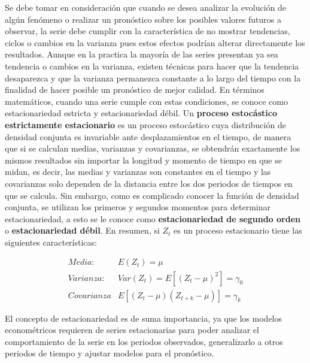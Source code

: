 Se debe tomar en consideración que cuando se desea analizar la evolución de algún fenómeno o realizar un pronóstico sobre los posibles valores futuros a observar, la serie debe cumplir con la característica de no mostrar tendencias, ciclos o cambios en la varianza  pues estos efectos podrían alterar directamente los resultados. Aunque en la practica la mayoría de las series presentan ya sea tendencia o cambios en la varianza, existen técnicas para hacer que la tendencia desaparezca y que la varianza permanezca constante a lo largo del tiempo con la finalidad de hacer posible un pronóstico de mejor calidad. En términos matemáticos, cuando una serie cumple con estas condiciones, se conoce como estacionariedad estricta y estacionariedad débil. Un \textbf{proceso estocástico estrictamente estacionario} es un proceso estocástico cuya distribución de densidad conjunta es invariable ante desplazamientos en el tiempo, de manera que si se calculan medias, varianzas y covarianzas, se obtendrán exactamente los mismos resultados sin importar la longitud y momento de tiempo en que se midan, es decir, las medias y varianzas son constantes en el tiempo y las covarianzas  solo dependen de la distancia entre los dos periodos de tiempos en que se calcula. Sin embargo, como es complicado conocer la función de densidad conjunta, se utilizan los primeros y segundos momentos para determinar estacionariedad, a esto se le conoce como \textbf{estacionariedad de segundo orden } o \textbf{estacionariedad débil}. En resumen, si $Z_t$ es un proceso estacionario tiene las siguientes características:

\begin{eqnarray}
        Media: & E(Z_t)=\mu  \nonumber \\ 
        Varianza:  & Var(Z_t)=E[(Z_t- \mu )^2]=\gamma_0   \\ 
        Covarianza & E[(Z_t-\mu)(Z_{t+k}-\mu)]=\gamma_k  \nonumber 
\end{eqnarray} 

El concepto de estacionariedad es de suma importancia, ya que los modelos econométricos requieren de series estacionarias para poder analizar el comportamiento de la serie en los periodos observados, generalizarlo a otros periodos de tiempo y ajustar modelos para el pronóstico.\newline

